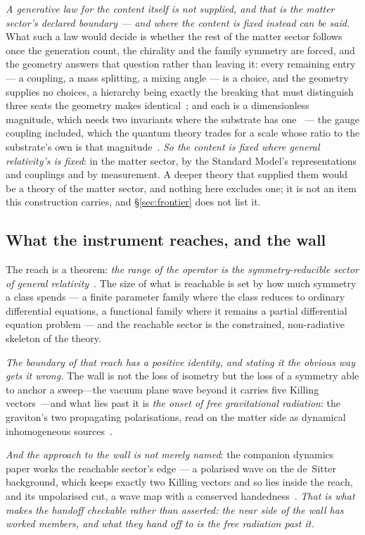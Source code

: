 \documentclass[11pt,a4paper]{article}
\theoremstyle{plain}
\theoremstyle{definition}
\begin{document}
\emph{A generative law for the content itself is not supplied, and that is the matter sector's declared
boundary --- and where the content is fixed instead can be said.} What such a law would decide is whether the
rest of the matter sector follows once the generation count, the chirality and the family symmetry are forced,
and the geometry answers that question rather than leaving it: every remaining entry --- a coupling, a mass
splitting, a mixing angle --- is a choice, and the geometry supplies no choices, a hierarchy being exactly the
breaking that must distinguish three seats the geometry makes identical~\cite{JanzenOperator,JanzenMatter}; and
each is a dimensionless magnitude, which needs two invariants where the substrate has
one~\cite{JanzenGeometricCore} --- the gauge coupling included, which the quantum theory trades for a scale whose
ratio to the substrate's own is that magnitude~\cite{JanzenMatter}. \emph{So the content is fixed where general relativity's is fixed}: in the
matter sector, by the Standard Model's representations and couplings and by measurement. A deeper theory that
supplied them would be a theory of the matter sector, and nothing here excludes one; it is not an item this
construction carries, and \S\ref{sec:frontier} does not list it.

\subsection{What the instrument reaches, and the wall}

The reach is a theorem: \emph{the range of the operator is the symmetry-reducible sector of general
relativity}~\cite{JanzenRange}. The size of what is reachable is set by how much symmetry a class spends ---
a finite parameter family where the class reduces to ordinary differential equations, a functional family
where it remains a partial differential equation problem --- and the reachable sector is the constrained,
non-radiative skeleton of the theory.

\emph{The boundary of that reach has a positive identity, and stating it the obvious way gets it wrong.} The
wall is not the loss of isometry but the loss of a symmetry able to anchor a sweep---the vacuum plane wave
beyond it carries five Killing vectors~\cite{JanzenRange}---and what lies past it is \emph{the onset of free gravitational radiation}: the
graviton's two propagating polarisations, read on the matter side as dynamical inhomogeneous
sources~\cite{JanzenRange}.

\emph{And the approach to the wall is not merely named}: the companion dynamics paper works the reachable
sector's edge --- a polarised wave on the de~Sitter background, which keeps exactly two Killing vectors and so
lies inside the reach, and its unpolarised cut, a wave map with a conserved handedness~\cite{JanzenDynamics}.
\emph{That is what makes the handoff checkable rather than asserted: the near side of the wall has worked
members, and what they hand off to is the free radiation past it.}
\end{document}
